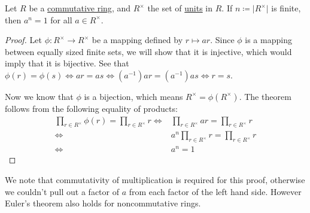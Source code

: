 \documentclass{scrartcl}
\begin{document}
\begin{theorem}[Euler]
    Let $R$ be a \hyperref[def:commutative ring]{commutative ring}, and $R^\times$ the set of
    \hyperref[def:unit]{units} in $R$.
    If $n\coloneqq\lvert R^\times\rvert$ is finite, then $a^n=1$ for all $a\in R^\times$.
\end{theorem}

\begin{proof}
    Let $\phi:R^\times\to R^\times$ be a mapping defined by $r\mapsto ar$.
    Since $\phi$ is a mapping between equally sized finite sets, we will show that it is injective, which would imply
    that it is bijective.
    See that $\phi(r)=\phi(s)\iff ar=as\iff (a^{-1})ar=(a^{-1})as\iff r=s$.

    Now we know that $\phi$ is a bijection, which means $R^\times=\phi(R^\times)$.
    The theorem follows from the following equality of products:
    \begin{align}
        \prod_{r\in R^\times}\phi(r)=\prod_{r\in R^\times}r
        \iff&\prod_{r\in R^\times}ar=\prod_{r\in R^\times}r \\
        \iff&a^n\prod_{r\in R^\times}r=\prod_{r\in R^\times}r \\
        \iff&a^n=1
    \end{align}
\end{proof}

\begin{remark}
    We note that commutativity of multiplication is required for this proof, otherwise we couldn't pull out a factor of
    $a$ from each factor of the left hand side.
    However Euler's theorem also holds for noncommutative rings.
\end{remark}
\end{document}
